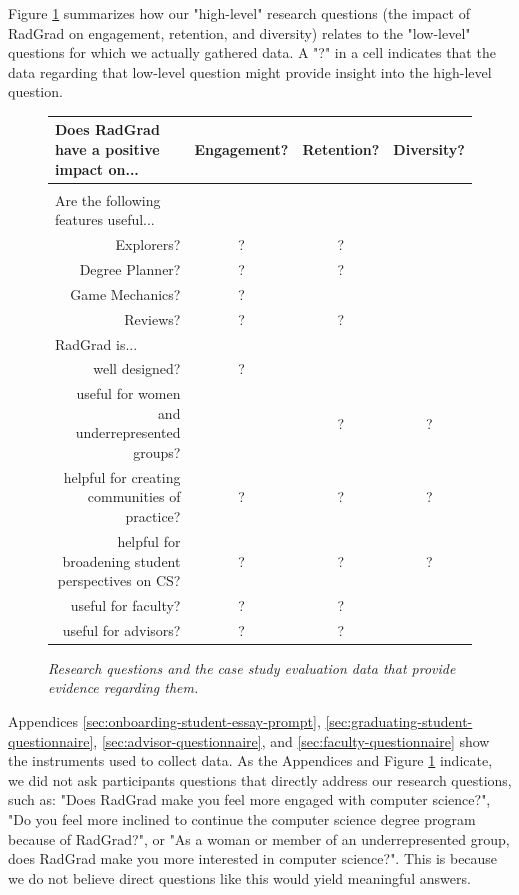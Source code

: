 \documentclass[acmsmall,nonacm]{acmart}
\begin{document}
Figure \ref{fig:eval-questions} summarizes how our "high-level" research questions (the impact of RadGrad on engagement, retention, and diversity) relates to the "low-level" questions for which we actually gathered data. A "?" in a cell indicates that the data regarding that low-level question might provide insight into the high-level question.

\begin{figure}[th]
\centering
\small
\begin{tabular}{ p{1in} p{1in} c c c }
\hline
\multicolumn{2}{l}{Does RadGrad have a positive impact on...} & Engagement? & Retention? & Diversity? \\
\hline\\[0.05cm]
Are the following features useful... & &  &  & \\
\multicolumn{2}{r}{Explorers?} & ? & ? & \\
\multicolumn{2}{r}{Degree Planner?} & ? & ? & \\
\multicolumn{2}{r}{Game Mechanics?} & ? &  & \\
\multicolumn{2}{r}{Reviews?} & ? & ? & \\[0.5cm]
RadGrad is... & &  &  & \\
\multicolumn{2}{r}{well designed?} & ? &  & \\
\multicolumn{2}{r}{useful for women and underrepresented groups?} &  & ? & ? \\
\multicolumn{2}{r}{helpful for creating communities of practice?} & ? & ? & ? \\
\multicolumn{2}{r}{helpful for broadening student perspectives on CS?} & ? & ? & ? \\
\multicolumn{2}{r}{useful for faculty?} & ? & ? & \\
\multicolumn{2}{r}{useful for advisors?} & ? & ? & \\
\hline
\end{tabular}
\caption{\em Research questions and the case study evaluation data that provide evidence regarding them.}
\normalsize
\label{fig:eval-questions}
\end{figure}

Appendices \ref{sec:onboarding-student-essay-prompt}, \ref{sec:graduating-student-questionnaire}, \ref{sec:advisor-questionnaire}, and \ref{sec:faculty-questionnaire} show the instruments used to collect data. As the Appendices and Figure \ref{fig:eval-questions} indicate, we did not ask participants questions that directly address our research questions, such as: "Does RadGrad make you feel more engaged with computer science?", "Do you feel more inclined to continue the computer science degree program because of RadGrad?", or "As a woman or member of an underrepresented group, does RadGrad make you more interested in computer science?".  This is because we do not believe direct questions like this would yield meaningful answers.
\end{document}
